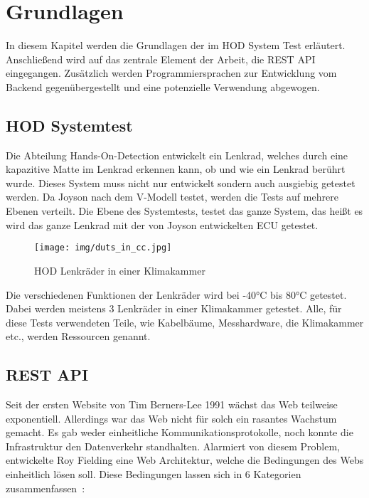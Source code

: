 \section{Grundlagen}
In diesem Kapitel werden die Grundlagen der im \gls{HOD} System Test erläutert.
Anschließend wird auf das zentrale Element der Arbeit, die REST API eingegangen.
Zusätzlich werden Programmiersprachen zur Entwicklung vom \gls{Backend} 
gegenübergestellt und eine potenzielle Verwendung abgewogen.

\subsection{HOD Systemtest}
Die Abteilung Hands-On-Detection entwickelt ein Lenkrad, welches durch eine 
kapazitive Matte im Lenkrad erkennen kann, ob und wie ein Lenkrad berührt wurde.
Dieses System muss nicht nur entwickelt sondern auch ausgiebig getestet werden.
Da Joyson nach dem V-Modell testet, werden die Tests auf mehrere Ebenen verteilt.
Die Ebene des Systemtests, testet das ganze System, das heißt es wird das ganze
Lenkrad mit der von Joyson entwickelten \gls{ECU} getestet.

\begin{figure}[H]
    \texttt{[image: img/duts\_in\_cc.jpg]}
    \centering
    \caption{HOD Lenkräder in einer Klimakammer}
\end{figure}

Die verschiedenen Funktionen der Lenkräder wird bei -40°C bis 80°C getestet. 
Dabei werden meistens 3 Lenkräder in einer Klimakammer getestet. Alle, für 
diese Tests verwendeten Teile, wie Kabelbäume, Messhardware, die Klimakammer etc.,
werden Ressourcen genannt.


\subsection{REST API}\label{sec:restapi}
Seit der ersten Website von Tim Berners-Lee 1991 wächst das Web teilweise 
exponentiell. Allerdings war das Web nicht für solch ein rasantes Wachstum gemacht.
Es gab weder einheitliche Kommunikationsprotokolle, noch konnte die Infrastruktur
den Datenverkehr standhalten. Alarmiert von diesem Problem, entwickelte Roy Fielding
eine Web Architektur, welche die Bedingungen des Webs einheitlich lösen soll.
Diese Bedingungen lassen sich in 6 Kategorien zusammenfassen~\cite{Mas11}:

